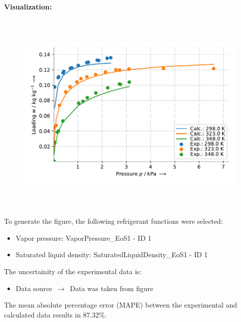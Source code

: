 \textbf{Visualization:}
%
\begin{figure}[!htp]
{\noindent\includegraphics[height=10cm, keepaspectratio]{figs/ads/ads_Water_zeotype_powder_ETS-10_DubininAstakhov_1.pdf}}
\end{figure}
%

To generate the figure, the following refrigerant functions were selected:
\begin{itemize}
\item Vapor pressure: VaporPressure\_EoS1 - ID 1
\item Saturated liquid density: SaturatedLiquidDensity\_EoS1 - ID 1
\end{itemize}

The uncertainity of the experimental data is:
\begin{itemize}
\item Data source $\,\to\,$ Data was taken from figure
\end{itemize}

The mean absolute percentage error (MAPE) between the experimental and calculated data results in 87.32\%.
\FloatBarrier
\newpage
